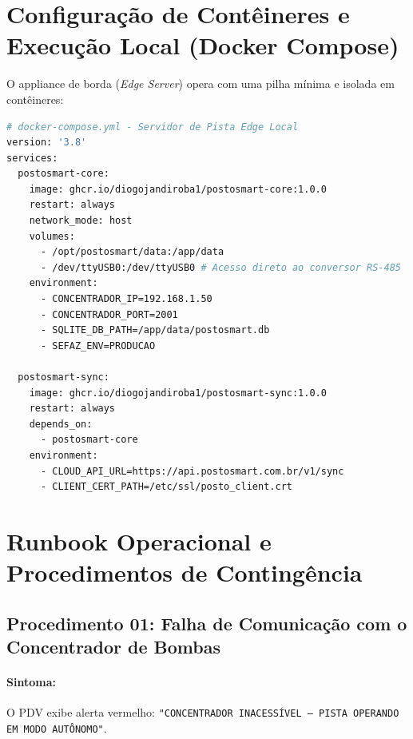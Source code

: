 \section{Configuração de Contêineres e Execução Local (Docker Compose)}

O appliance de borda (\textit{Edge Server}) opera com uma pilha mínima e isolada em contêineres:

\begin{lstlisting}[language=bash]
# docker-compose.yml - Servidor de Pista Edge Local
version: '3.8'
services:
  postosmart-core:
    image: ghcr.io/diogojandiroba1/postosmart-core:1.0.0
    restart: always
    network_mode: host
    volumes:
      - /opt/postosmart/data:/app/data
      - /dev/ttyUSB0:/dev/ttyUSB0 # Acesso direto ao conversor RS-485
    environment:
      - CONCENTRADOR_IP=192.168.1.50
      - CONCENTRADOR_PORT=2001
      - SQLITE_DB_PATH=/app/data/postosmart.db
      - SEFAZ_ENV=PRODUCAO

  postosmart-sync:
    image: ghcr.io/diogojandiroba1/postosmart-sync:1.0.0
    restart: always
    depends_on:
      - postosmart-core
    environment:
      - CLOUD_API_URL=https://api.postosmart.com.br/v1/sync
      - CLIENT_CERT_PATH=/etc/ssl/posto_client.crt
\end{lstlisting}

\section{Runbook Operacional e Procedimentos de Contingência}

\subsection{Procedimento 01: Falha de Comunicação com o Concentrador de Bombas}
\paragraph{Sintoma:} O PDV exibe alerta vermelho: \texttt{"CONCENTRADOR INACESSÍVEL -- PISTA OPERANDO EM MODO AUTÔNOMO"}.
